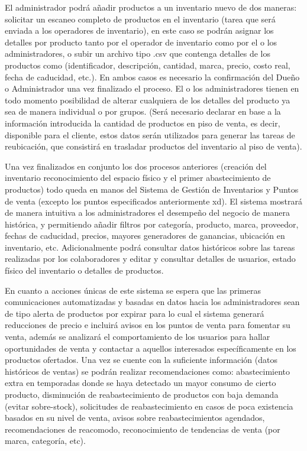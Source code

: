 \documentclass{article}
\begin{document}
El administrador podrá añadir productos a un inventario nuevo de dos maneras: solicitar un escaneo completo de productos en el inventario (tarea que será enviada a los operadores de inventario), en este caso se podrán asignar los detalles por producto tanto por el operador de inventario como por el o los administradores, o subir un archivo tipo .csv que contenga detalles de los productos como (identificador, descripción, cantidad, marca, precio, costo real, fecha de caducidad, etc.). En ambos casos es necesario la confirmación del Dueño o Administrador una vez finalizado el proceso. El o los administradores tienen en todo momento posibilidad de alterar cualquiera de los detalles del producto ya sea de manera individual o por grupos. (Será necesario declarar en base a la información introducida la cantidad de productos en piso de venta, es decir, disponible para el cliente, estos datos serán utilizados para generar las tareas de reubicación, que consistirá en trasladar productos del inventario al piso de venta).

Una vez finalizados en conjunto los dos procesos anteriores (creación del inventario  reconocimiento del espacio físico y el primer abastecimiento de productos) todo queda en manos del Sistema de Gestión de Inventarios y Puntos de venta (excepto los puntos especificados anteriormente xd). El sistema mostrará de manera intuitiva a los administradores el desempeño del negocio de manera histórica, y permitiendo añadir filtros por categoría, producto, marca, proveedor, fechas de caducidad, precios, mayores generadores de ganancias, ubicación en inventario, etc. Adicionalmente podrá consultar datos históricos sobre las tareas realizadas por los colaboradores y editar y consultar detalles de usuarios, estado físico del inventario o detalles de productos. 

En cuanto a acciones únicas de este sistema se espera que las primeras comunicaciones automatizadas y basadas en datos hacia los administradores sean de tipo alerta de productos por expirar para lo cual el sistema generará reducciones de precio e incluirá avisos en los puntos de venta para fomentar su venta, además se analizará el comportamiento de los usuarios para hallar oportunidades de venta y contactar a aquellos interesados específicamente en los productos ofertados.  Una vez se cuente con la suficiente información (datos históricos de ventas) se podrán realizar recomendaciones como: abastecimiento extra en temporadas donde se haya detectado un mayor consumo de cierto producto, disminución de reabastecimiento de productos con baja demanda (evitar sobre-stock), solicitudes de reabastecimiento en casos de poca existencia basados en su nivel de venta, avisos sobre reabastecimientos agendados, recomendaciones de reacomodo, reconocimiento de tendencias de venta (por marca, categoría, etc).
\end{document}
